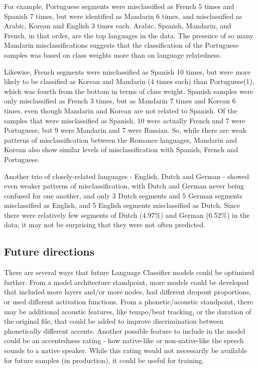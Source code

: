 For example, Portuguese segments were misclassified as French 5 times and Spanish 7 times, but were identified as Mandarin 6 times, and misclassified as Arabic, Korean and English 3 times each. Arabic, Spanish, Mandarin, and French, in that order, are the top languages in the data. The presence of so many Mandarin misclassifications suggests that the classification of the Portuguese samples was based on class weights more than on language relatedness.

Likewise, French segments were misclassified as Spanish 10 times, but were more likely to be classified as Korean and Mandarin (4 times each) than Portuguese(1), which was fourth from the bottom in terms of class weight. Spanish samples were only misclassified as French 3 times, but as Mandarin 7 times and Korean 6 times, even though Mandarin and Korean are not related to Spanish. Of the samples that were misclassified as Spanish, 10 were actually French and 7 were Portuguese, but 9 were Mandarin and 7 were Russian. So, while there are weak patterns of misclassification between the Romance languages, Mandarin and Korean also show similar levels of misclassification with Spanish, French and Portuguese. 

Another trio of closely-related languages - English, Dutch and German - showed even weaker patterns of misclassification, with Dutch and German never being confused for one another, and only 3 Dutch segments and 5 German segments misclassified as English, and 5 English segments misclassified as Dutch. Since there were relatively few segments of Dutch (4.97\%) and German (6.52\%) in the data, it may not be surprising that they were not often predicted.

\subsection{Future directions}
There are several ways that future Language Classifier models could be optimized further. From a model architecture standpoint, more models could be developed that included more layers and/or more nodes, had different dropout proportions, or used different activation functions.  From a phonetic/acoustic standpoint, there may be additional acoustic features, like tempo/beat tracking, or the duration of the original file, that could be added to improve discrimination between phonetically different accents. Another possible feature to include in the model could be an accentedness rating - how native-like or non-native-like the speech sounds to a native speaker. While this rating would not necessarily be available for future samples (in production), it could be useful for training.

